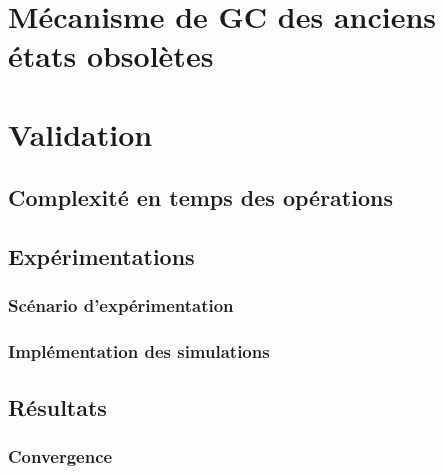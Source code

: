 % 

\section{Mécanisme de \acl{GC} des anciens états obsolètes}


\section{Validation}
\label{sec:evaluation}



\subsection{Complexité en temps des opérations}


\subsection{Expérimentations}


\subsubsection{Scénario d'expérimentation}


\subsubsection{Implémentation des simulations}


\subsection{Résultats}


\subsubsection{Convergence}


